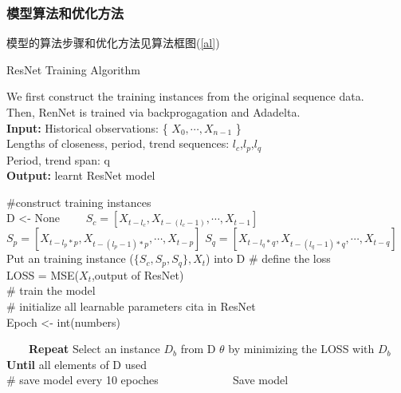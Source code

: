 \subsubsection*{模型算法和优化方法}
模型的算法步骤和优化方法见算法框图(\ref{al}) 
\begin{algorithm}[t]
\caption{ResNet Training Algorithm} %
We first construct the training
instances from the original sequence data.\\ Then, RenNet is trained via backprogagation and Adadelta.\\
\hspace*{0.02in} {\bf Input:} %
Historical observations: \{ $X_0,\cdots,X_{n-1}$ \}\\
\hspace*{0.02in} Lengths of closeness, period, trend sequences: $l_c$,$l_p$,$l_q$\\
\hspace*{0.02in} Period, trend span: q\\
\hspace*{0.02in} {\bf Output:} %
learnt ResNet model\\
\begin{algorithmic}[1]
\State \#construct training instances\\
D <- None %
　　\State $S_c = [X_{t-l_c},X_{t-(l_c-1)},\cdots,X_{t-1}]$
	\State $S_p = [X_{t-l_p*p},X_{t-(l_p-1)*p},\cdots,X_{t-p}]$
	\State $S_q = [X_{t-l_q*q},X_{t-(l_q-1)*q},\cdots,X_{t-q}]$\\
Put an training instance ($\{S_c,S_p,S_q \},X_t$) into D
\EndFor
\# define the loss
\\
LOSS = MSE($X_t$,output of ResNet)\\
\# train the model\\
\# initialize all learnable parameters cita in ResNet\\
Epoch <- int(numbers)

　　\State \textbf{Repeat}
	\State Select an instance $D_b$ from D
	\State $\theta$ by minimizing the LOSS with $D_b$
\textbf{Until} all elements of D used\\
\# save model every 10 epoches
　　　　\State Save model
　　\EndIf
\EndFor
\end{algorithmic}
\label{al}
\end{algorithm}